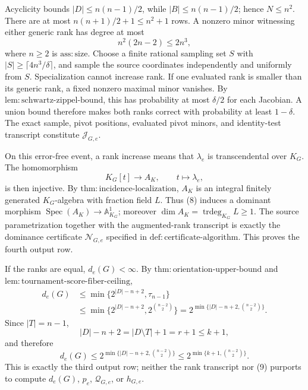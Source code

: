 Acyclicity bounds \(|D|\leq n(n-1)/2\), while \(|B|\leq n(n-1)/2\); hence \(N\leq n^2\).  There are at most \(n(n+1)/2+1\leq n^2+1\) rows.  A nonzero minor witnessing either generic rank has degree at most
\[
 n^2(2n-2)\leq2n^3,
\tag{7}
\]
where \(n\geq2\) is \(\mathrm{ass:size}\).  Choose a finite rational sampling set \(S\) with \(|S|\geq\lceil4n^3/\delta\rceil\), and sample the source coordinates independently and uniformly from \(S\).  Specialization cannot increase rank.  If one evaluated rank is smaller than its generic rank, a fixed nonzero maximal minor vanishes.  By \(\mathrm{lem:schwartz\mbox{-}zippel\mbox{-}bound}\), this has probability at most \(\delta/2\) for each Jacobian.  A union bound therefore makes both ranks correct with probability at least \(1-\delta\).  The exact sample, pivot positions, evaluated pivot minors, and identity-test transcript constitute \(\mathcal J_{G,e}\).

On this error-free event, a rank increase means that \(\lambda_e\) is transcendental over \(K_G\).  The homomorphism
\[
 K_G[t]\longrightarrow A_K,\qquad t\longmapsto\lambda_e,
\tag{8}
\]
is then injective.  By \(\mathrm{thm:incidence\mbox{-}localization}\), \(A_K\) is an integral finitely generated \(K_G\)-algebra with fraction field \(L\).  Thus (8) induces a dominant morphism \(\operatorname{Spec}(A_K)\to\mathbb A^1_{K_G}\); moreover \(\dim A_K=\operatorname{trdeg}_{K_G}L\geq1\).  The source parametrization together with the augmented-rank transcript is exactly the dominance certificate \(\mathcal N_{G,e}\) specified in \(\mathrm{def:certificate\mbox{-}algorithm}\).  This proves the fourth output row.

If the ranks are equal, \(d_e(G)<\infty\).  By \(\mathrm{thm:orientation\mbox{-}upper\mbox{-}bound}\) and \(\mathrm{lem:tournament\mbox{-}score\mbox{-}fiber\mbox{-}ceiling}\),
\[
\begin{aligned}
 d_e(G)
 &\leq\min\{2^{|D|-n+2},\tau_{n-1}\}\\
 &\leq\min\{2^{|D|-n+2},2^{\binom{n-2}{2}}\}
 =2^{\min\{|D|-n+2,\binom{n-2}{2}\}}.
\end{aligned}
\tag{9}
\]
Since \(|T|=n-1\),
\[
 |D|-n+2=|D\setminus T|+1=r+1\leq k+1,
\tag{10}
\]
and therefore
\[
 d_e(G)\leq2^{\min\{|D|-n+2,\binom{n-2}{2}\}}
 \leq2^{\min\{k+1,\binom{n-2}{2}\}}.
\tag{11}
\]
This is exactly the third output row; neither the rank transcript nor (9) purports to compute \(d_e(G)\), \(p_e\), \(\mathcal Q_{G,e}\), or \(h_{G,e}\).

